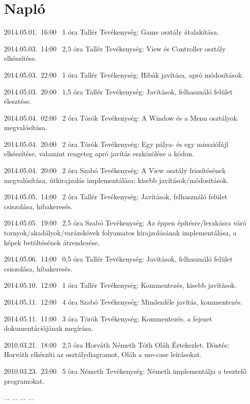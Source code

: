 %
\section{Napló}

\begin{naplo}

\bejegyzes
{2014.05.01.~16:00~}
{1 óra}
{Tallér}
{Tevékenység: Game osztály átalakítása.}

\bejegyzes
{2014.05.03.~14:00~}
{2,5 óra}
{Tallér}
{Tevékenység: View és Controller osztály elkészítése.}

\bejegyzes
{2014.05.03.~22:00~}
{1 óra}
{Tallér}
{Tevékenység: Hibák javítása, apró módosítások.}

\bejegyzes
{2014.05.03.~20:00~}
{1,5 óra}
{Tallér}
{Tevékenység: Javítások, felhasználó felület élesztése.}

\bejegyzes
{2014.05.04.~02:00~}
{2 óra}
{Török}
{Tevékenység: A Window és a Menu osztályok megvalósítása.}

\bejegyzes
{2014.05.04.~20:00~}
{2 óra}
{Török}
{Tevékenység: Egy pálya- és egy missziófájl elkészítése, valamint rengeteg apró javítás eszközölése a kódon.}

\bejegyzes
{2014.05.04.~20:00~}
{2 óra}
{Szabó}
{Tevékenység: A View osztály frissítésének megvalósítása, útkirajzolás implementálása; kisebb javítások/módosítások.}

\bejegyzes
{2014.05.05.~14:00~}
{2 óra}
{Tallér}
{Tevékenység: Javítások, felhasználó felület csiszolása, hibakeresés.}

\bejegyzes
{2014.05.05.~19:00~}
{2,5 óra}
{Szabó}
{Tevékenység: Az éppen építésre/lerakásra váró tornyok/akadályok/varázskövek folyamatos kirajzolásának implementálása, a képek betöltésének átrendezése.}

\bejegyzes
{2014.05.06.~14:00~}
{0,5 óra}
{Tallér}
{Tevékenység: Javítások, felhasználó felület csiszolása, hibakeresés.}

\bejegyzes
{2014.05.10.~12:00~}
{1 óra}
{Tallér}
{Tevékenység: Kommentezés, kisebb javítások.}

\bejegyzes
{2014.05.11.~12:00~}
{4 óra}
{Szabó}
{Tevékenység: Mindenféle javítás, kommentezés.}

\bejegyzes
{2014.05.11.~11:00~}
{3 óra}
{Török}
{Tevékenység: Kommentezés, a fejezet dokumentációjának megírása.}


\bejegyzes
{2010.03.21.~18:00~} %
{2,5 óra} %
{Horváth\newline
Németh\newline
Tóth\newline
Oláh} %
{Értekezlet. Döntés: Horváth elkészíti az osztálydiagramot, Oláh a use-case leírásokat.} %

\bejegyzes
{2010.03.23.~23:00~}
{5 óra}
{Németh}
{Tevékenység: Németh implementálja a tesztelő programokat.}

\bejegyzes
{...}
{...}
{...}
{...}


\end{naplo}

